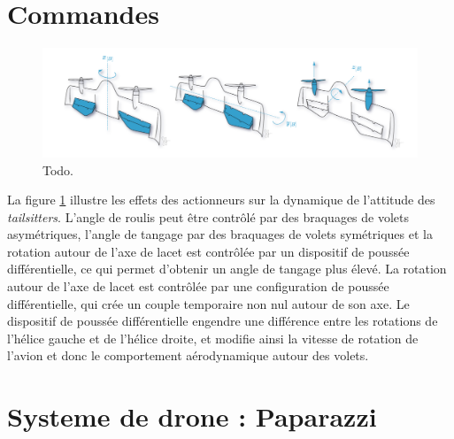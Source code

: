 \section{Commandes}

\begin{figure}[ht!]
    \centerline{
    \includegraphics[trim=0cm 0cm 0cm 0cm,clip,width=1\columnwidth]{figures/actionnement.png}}
    \caption{Todo.}
    \label{fig:actionDarko}
\end{figure}

La figure \ref{fig:actionDarko} illustre les effets des actionneurs sur la dynamique de l'attitude des \textit{tailsitters}. L'angle de roulis  peut être contrôlé par des braquages de volets asymétriques, l'angle de tangage par des braquages de volets symétriques et la rotation autour de l'axe de lacet est contrôlée par un dispositif de poussée différentielle, ce qui permet d'obtenir un angle de tangage plus élevé. La rotation autour de l'axe de lacet est contrôlée par une configuration de poussée différentielle, qui crée un couple temporaire non nul autour de son axe. Le dispositif de poussée différentielle engendre une différence entre les rotations de l'hélice gauche et de l'hélice droite, et modifie ainsi la vitesse de rotation de l'avion et donc le comportement aérodynamique autour des volets.

\section{Systeme de drone : Paparazzi}
